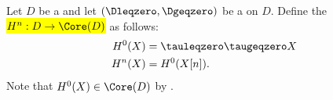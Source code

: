 \begin{definition} \label{definition:cohomology_functors_for_a_triangulated_category_with_a_t_structure}
    Let $D$ be a  and let $(\Dleqzero, \Dgeqzero)$ be a  on $D$.
    Define the  \hl{$H^n: D \to \Core(D)$} as follows:
    \begin{align*}
        H^0(X) &= \tauleqzero \taugeqzero X \\
        H^n(X) &= H^0(X[n]).
    \end{align*}
    Note that $H^0(X) \in \Core(D)$ by .
\end{definition}